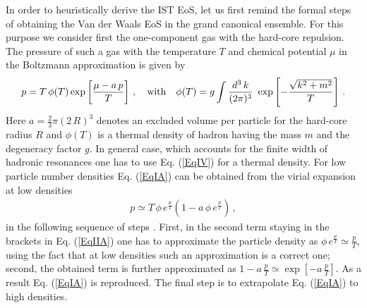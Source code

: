 \documentclass[12pt]{article}
\begin{document}
In order to   heuristically derive the IST EoS, let us first 
remind  the formal steps of  obtaining the Van der Waals EoS in the grand canonical 
ensemble. For this purpose we  consider  first the one-component gas with the hard-core repulsion.  The pressure of such a gas  with the temperature $T$ and chemical potential $\mu$  in the Boltzmann  approximation is given by 
%
\begin{eqnarray}\label{EqIA}
%
p=T \, \phi (T) \exp\left[ \frac{\mu-a\, p}{T} \right] \,, \quad {\rm with} \quad \phi (T) = g \int \frac{d^3 \, 
 k}{(2\pi)^3}~\exp\left[  -\frac{ \sqrt{k^2 + m^2} }{T} \right] \,. 
%
\end{eqnarray}
Here  $a = \frac{2}{3} \pi (2\, R)^3$ denotes an excluded volume  per particle for the hard-core radius $R$ and  $\phi (T)$  is a thermal density 
of  hadron  having the mass $m$  and the degeneracy factor $g$. In general  case, which accounts for  the finite width of hadronic resonances  one has to use  
Eq.  (\ref{EqIV}) for a thermal density.
For  low particle number  densities Eq. (\ref{EqIA}) can be obtained from the virial expansion  at low densities 
%
\begin{eqnarray}
\label{EqIIA}
%
p \simeq  T \, 
\phi \, e^{\frac{\mu}{T}}\left(1-a\, \phi \, e^{\frac{\mu}{T}}\right) \,, 
%
\end{eqnarray}
%
in the following sequence of steps \cite{Bugaev:13NPA}. First, in the second term staying in the brackets in  Eq. (\ref{EqIIA})  one has to approximate the particle density as $\phi \, e^{\frac{\mu}{T}} \simeq \frac{p}{T} $, using the fact that at low densities such an approximation is a correct one; second, the obtained term is further approximated as  $1 - a\, \frac{p}{T} \simeq \exp\left[ - a\, \frac{p}{T}  \right] $. As a  result Eq. (\ref{EqIA}) is reproduced. The final step is to extrapolate Eq. (\ref{EqIA}) to high densities. 
\end{document}
